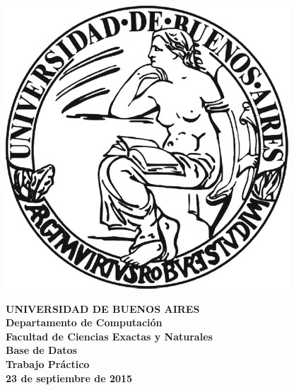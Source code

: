 \documentclass[11pt,a4paper]{article}
\begin{document}

\def\Materia{Base de Datos}
\def\Titulo{Trabajo Pr\'{a}ctico}
\def\Fecha{23 de septiembre de 2015}


\thispagestyle{empty}

\begin{center}
	\includegraphics[scale = 0.25]{imagenes/logo_uba.jpg}
\end{center}

\begin{center}
	{\textbf{\large UNIVERSIDAD DE BUENOS AIRES}}\\[1.5em]
	{\textbf{\large Departamento de Computaci\'{o}n}}\\[1.5em]
    {\textbf{\large Facultad de Ciencias Exactas y Naturales}}\\
    \vspace{35mm}
    {\LARGE\textbf{\Materia}}\\[1em]    
    \vspace{15mm}
    {\Large \textbf{\Titulo}}\\[1em]
    \vspace{15mm}
    {\textbf{\Large \Fecha}}\\
    \vspace{15mm}
    \textbf{\tablaints}
\end{center}

\newpage
\thispagestyle{empty}
\tableofcontents

\parskip=5pt
\setlength{\parindent}{0pt}

\newpage
\setcounter{page}{1}
\pagestyle{plain}











\end{document}
